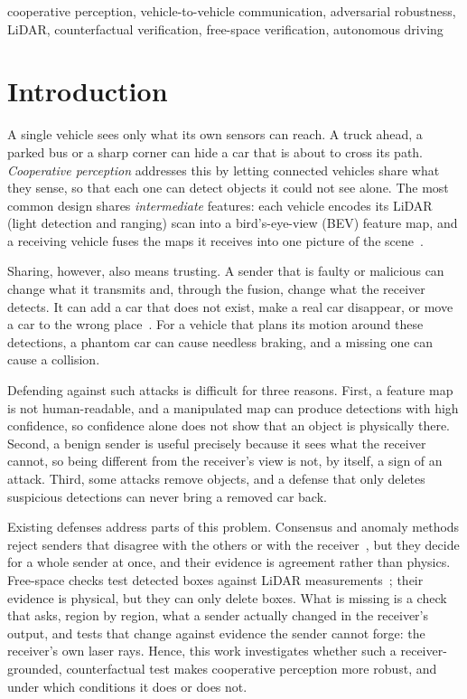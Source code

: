 \documentclass[conference]{IEEEtran}
\begin{document}
\begin{IEEEkeywords}
cooperative perception, vehicle-to-vehicle communication, adversarial robustness, LiDAR, counterfactual
verification, free-space verification, autonomous driving
\end{IEEEkeywords}

\section{Introduction}
\label{sec:intro}
A single vehicle sees only what its own sensors can reach. A truck ahead, a parked bus or a sharp corner can hide
a car that is about to cross its path. \emph{Cooperative perception} addresses this by letting connected vehicles
share what they sense, so that each one can detect objects it could not see alone. The most common design shares
\emph{intermediate} features: each vehicle encodes its LiDAR (light detection and ranging) scan into a
bird's-eye-view (BEV) feature map, and a receiving vehicle fuses the maps it receives into one picture of the
scene~\cite{xu2022opv2v,hu2022where2comm,xu2022v2xvit}.

Sharing, however, also means trusting. A sender that is faulty or malicious can change what it transmits and,
through the fusion, change what the receiver detects. It can add a car that does not exist, make a real car
disappear, or move a car to the wrong place~\cite{tu2021adversarial,zhang2024cad,wang2025lucia,zhang2026poseguard}.
For a vehicle that plans its motion around these detections, a phantom car can cause needless braking, and a
missing one can cause a collision.

Defending against such attacks is difficult for three reasons. First, a feature map is not human-readable, and a
manipulated map can produce detections with high confidence, so confidence alone does not show that an object is
physically there. Second, a benign sender is useful precisely because it sees what the receiver cannot, so being
different from the receiver's view is not, by itself, a sign of an attack. Third, some attacks remove
objects, and a defense that only deletes suspicious detections can never bring a removed car back.

Existing defenses address parts of this problem. Consensus and anomaly methods reject senders that disagree with
the others or with the receiver~\cite{li2023robosac,zhao2024made,hu2025cpguard}, but they decide for a whole
sender at once, and their evidence is agreement rather than physics. Free-space checks test detected boxes against
LiDAR measurements~\cite{sun2020carlo,zhang2024cad}; their evidence is physical, but they can only delete boxes.
What is missing is a check that asks, region by region, what a sender actually changed in the receiver's output,
and tests that change against evidence the sender cannot forge: the receiver's own laser rays. Hence, this work
investigates whether such a receiver-grounded, counterfactual test makes cooperative perception more robust, and
under which conditions it does or does not.
\end{document}

